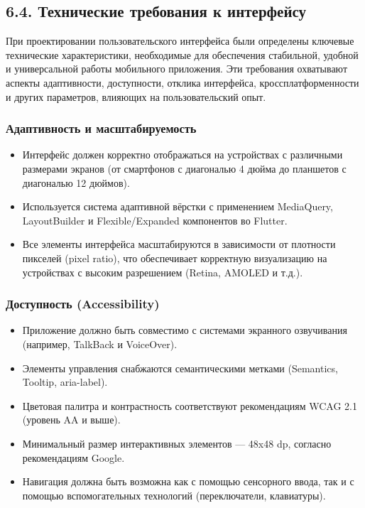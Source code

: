 \subsection*{6.4. Технические требования к интерфейсу}
При проектировании пользовательского интерфейса были определены ключевые технические характеристики, необходимые для обеспечения стабильной, удобной и универсальной работы мобильного приложения. Эти требования охватывают аспекты адаптивности, доступности, отклика интерфейса, кроссплатформенности и других параметров, влияющих на пользовательский опыт.

\subsubsection*{Адаптивность и масштабируемость}
\begin{itemize}
    \item Интерфейс должен корректно отображаться на устройствах с различными размерами экранов (от смартфонов с диагональю 4 дюйма до планшетов с диагональю 12 дюймов).
    \item Используется система адаптивной вёрстки с применением MediaQuery, LayoutBuilder и Flexible/Expanded компонентов во Flutter.
    \item Все элементы интерфейса масштабируются в зависимости от плотности пикселей (pixel ratio), что обеспечивает корректную визуализацию на устройствах с высоким разрешением (Retina, AMOLED и т.д.).
\end{itemize}

\subsubsection*{Доступность (Accessibility)}
\begin{itemize}
    \item Приложение должно быть совместимо с системами экранного озвучивания (например, TalkBack и VoiceOver).
    \item Элементы управления снабжаются семантическими метками (Semantics, Tooltip, aria-label).
    \item Цветовая палитра и контрастность соответствуют рекомендациям WCAG 2.1 (уровень AA и выше).
    \item Минимальный размер интерактивных элементов — 48x48 dp, согласно рекомендациям Google.
    \item Навигация должна быть возможна как с помощью сенсорного ввода, так и с помощью вспомогательных технологий (переключатели, клавиатуры).
\end{itemize}

